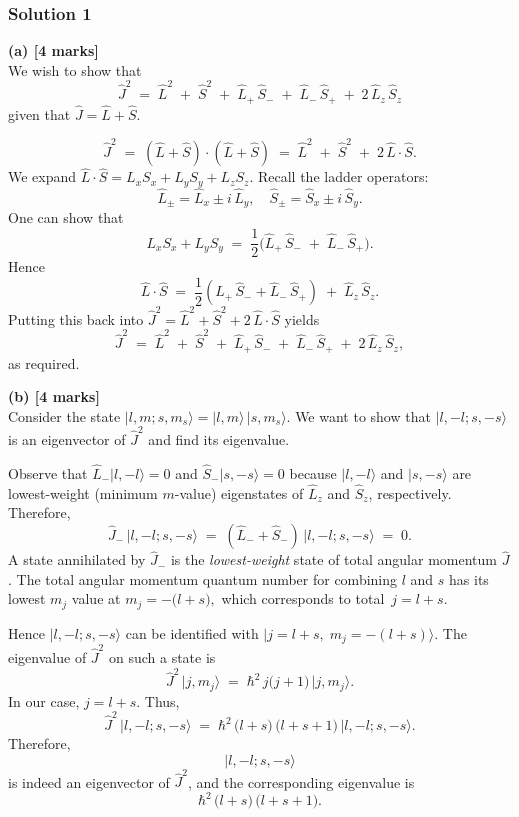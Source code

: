 \documentclass{article}
\begin{document}
\subsubsection{Solution 1}

\textbf{(a) [4 marks]}\\
We wish to show that 
\[
\hat{J}^2 \;=\; \hat{L}^2 \;+\; \hat{S}^2 \;+\; \hat{L}_+\,\hat{S}_- \;+\; \hat{L}_-\,\hat{S}_+ \;+\; 2\,\hat{L}_z\,\hat{S}_z
\]
given that \(\hat{J} = \hat{L} + \hat{S}\). 

\[
\hat{J}^2 \;=\; (\hat{L}+\hat{S}) \cdot (\hat{L}+\hat{S})
\;=\; \hat{L}^2 \;+\; \hat{S}^2 \;+\; 2\,\hat{L}\cdot\hat{S}.
\]
We expand \(\hat{L}\cdot \hat{S} = L_x S_x + L_y S_y + L_z S_z\). Recall the ladder operators:
\[
\hat{L}_\pm = \hat{L}_x \pm i\,\hat{L}_y, 
\quad
\hat{S}_\pm = \hat{S}_x \pm i\,\hat{S}_y.
\]
One can show that
\[
L_x S_x + L_y S_y
\;=\;
\frac{1}{2}\bigl(\hat{L}_+\,\hat{S}_- \;+\; \hat{L}_-\,\hat{S}_+\bigr).
\]
Hence
\[
\hat{L}\cdot\hat{S}
\;=\;
\frac{1}{2}(\hat{L}_+\,\hat{S}_- + \hat{L}_-\,\hat{S}_+) \;+\; \hat{L}_z \,\hat{S}_z.
\]
Putting this back into \(\hat{J}^2 = \hat{L}^2 + \hat{S}^2 + 2\,\hat{L}\cdot\hat{S}\) yields
\[
\hat{J}^2 
\;=\;
\hat{L}^2 
\;+\;
\hat{S}^2 
\;+\;
\hat{L}_+\,\hat{S}_- 
\;+\;
\hat{L}_-\,\hat{S}_+ 
\;+\;
2\,\hat{L}_z\,\hat{S}_z,
\]
as required.

\medskip

\textbf{(b) [4 marks]}\\
Consider the state \(\lvert l, m; s, m_s\rangle = \lvert l, m\rangle \,\lvert s, m_s\rangle\). We want to show that 
\(\lvert l, -l; s, -s\rangle\) 
is an eigenvector of \(\hat{J}^2\) and find its eigenvalue.

Observe that 
\(\hat{L}_- \lvert l, -l\rangle = 0\)
and
\(\hat{S}_- \lvert s, -s\rangle = 0\)
because \(\lvert l, -l\rangle\) and \(\lvert s, -s\rangle\) are lowest-weight (minimum \(m\)-value) eigenstates of \(\hat{L}_z\) and \(\hat{S}_z\), respectively. Therefore,
\[
\hat{J}_- \,\lvert l, -l; s, -s\rangle
\;=\;
(\hat{L}_- + \hat{S}_-)\,\lvert l, -l; s, -s\rangle
\;=\;
0.
\]
A state annihilated by \(\hat{J}_-\) is the \emph{lowest-weight} state of total angular momentum \(\hat{J}\). The total angular momentum quantum number for combining \(l\) and \(s\) has its lowest \(m_j\) value at 
\(
m_j = -\bigl(l + s\bigr),
\)
which corresponds to total \(\,j = l + s.\)

Hence \(\lvert l, -l; s, -s\rangle\) can be identified with \(\lvert j = l+s,\; m_j = -(l+s)\rangle\). 
The eigenvalue of \(\hat{J}^2\) on such a state is
\[
\hat{J}^2\,\lvert j, m_j\rangle 
\;=\; 
\hbar^2\,j\bigl(j+1\bigr)\,\lvert j, m_j\rangle.
\]
In our case, 
\(j = l + s\). 
Thus, 
\[
\hat{J}^2\,\lvert l, -l; s, -s\rangle
\;=\;
\hbar^2\,\bigl(l + s\bigr)\,\bigl(l + s + 1\bigr)\,
\lvert l, -l; s, -s\rangle.
\]
Therefore,
\[
\lvert l, -l; s, -s\rangle
\]
is indeed an eigenvector of \(\hat{J}^2\), and the corresponding eigenvalue is
\[
\hbar^2\,\bigl(l + s\bigr)\,\bigl(l + s + 1\bigr).
\]
\end{document}
